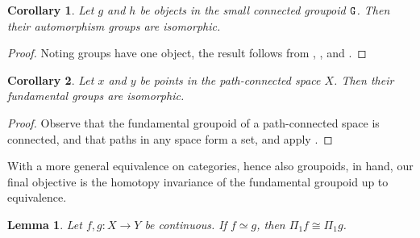 \documentclass[11 pt]{amsart}
\theoremstyle{plain}   %
\newtheorem{cor}{Corollary}[section]
\newtheorem{lemma}{Lemma}[section]
\theoremstyle{definition}
\theoremstyle{remark}
\numberwithin{equation}{section}
\newcommand{\cat}[1]{{\normalfont\texttt{#1}}}
\begin{document}
\begin{cor}\label{connected groups are isomorphic}
	Let $g$ and $h$ be objects in the small connected groupoid $\cat{G}$. Then their
	automorphism groups are isomorphic.
\end{cor}

\begin{proof}
	Noting groups have one object, the result follows from , , and .
\end{proof}

\begin{cor}
	Let $x$ and $y$ be points in the path-connected space $X$. Then their
	fundamental groups are isomorphic.
\end{cor}

\begin{proof}
	Observe that the fundamental groupoid of a path-connected space is connected,
	and that paths in any space form a set, and apply .
\end{proof}

With a more general equivalence on categories, hence also groupoids, in hand,
our final objective is the homotopy invariance of the fundamental groupoid up to
equivalence.

\begin{lemma}\label{pseudofunctor}
	Let $f,g: X\rightarrow Y$ be continuous. If $f\simeq g$, then
	$\Pi_1f\cong\Pi_1g$.
\end{lemma}
\end{document}
